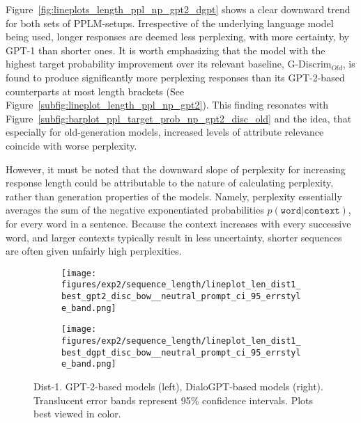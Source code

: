 
Figure~\ref{fig:lineplots_length_ppl_np_gpt2_dgpt} shows a clear downward trend for both sets of PPLM-setups. Irrespective of the underlying language model being used, longer responses are deemed less perplexing, with more certainty, by GPT-1 than shorter ones. It is worth emphasizing that the model with the highest target probability improvement over its relevant baseline, G-Discrim$_{Old}$, is found to produce significantly more perplexing responses than its GPT-2-based counterparts at most length brackets (See Figure~\ref{subfig:lineplot_length_ppl_np_gpt2}). This finding resonates with Figure~\ref{subfig:barplot_ppl_target_prob_np_gpt2_disc_old} and the idea, that especially for old-generation models, increased levels of attribute relevance coincide with worse perplexity.

However, it must be noted that the downward slope of perplexity for increasing response length could be attributable to the nature of calculating perplexity, rather than generation properties of the models. Namely, perplexity essentially averages the sum of the negative exponentiated probabilities $p(\texttt{word} | \texttt{context})$, for every word in a sentence. Because the context increases with every successive word, and larger contexts typically result in less uncertainty, shorter sequences are often given unfairly high perplexities.

\begin{figure}[H]
     \centering
     \begin{subfigure}[b]{0.49\textwidth}
        \centering
\texttt{[image: figures/exp2/sequence\_length/lineplot\_len\_dist1\_best\_gpt2\_disc\_bow\_\_neutral\_prompt\_ci\_95\_errstyle\_band.png]}
        \caption{}
        \label{subfig:lineplot_length_dist1_np_gpt2}
     \end{subfigure}
     \hfill
     \begin{subfigure}[b]{0.49\textwidth}
        \centering
        \texttt{[image: figures/exp2/sequence\_length/lineplot\_len\_dist1\_best\_dgpt\_disc\_bow\_\_neutral\_prompt\_ci\_95\_errstyle\_band.png]}
        \caption{}
        \label{subfig:lineplot_length_dist1_np_dgpt}
     \end{subfigure}
        \caption{Dist-1. GPT-2-based models (left), DialoGPT-based models (right). Translucent error bands represent 95\% confidence intervals. Plots best viewed in color.}
        \label{fig:lineplots_length_dist1_np_gpt2_dgpt}
\end{figure}

